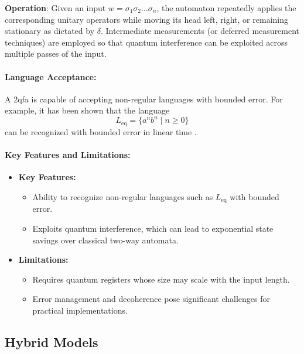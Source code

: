 \textbf{Operation}:  
Given an input \( w = \sigma_1\sigma_2\ldots\sigma_n \), the automaton repeatedly applies the corresponding unitary operators while moving its head left, right, or remaining stationary as dictated by \(\delta\). Intermediate measurements (or deferred measurement techniques) are employed so that quantum interference can be exploited across multiple passes of the input.

\paragraph{Language Acceptance:}  
A \gls{2qfa} is capable of accepting non-regular languages with bounded error. For example, it has been shown that the language 
\[
L_{\text{eq}} = \{a^n b^n \mid n \geq 0\}
\]
can be recognized with bounded error in linear time \cite{kondacs1997power, yakaryilmaz2010succinctness}.

\paragraph{Key Features and Limitations:}
\begin{itemize}
    \item \textbf{Key Features:}
    \begin{itemize}
        \item Ability to recognize non-regular languages such as \( L_{\text{eq}} \) with bounded error.
        \item Exploits quantum interference, which can lead to exponential state savings over classical two-way automata.
    \end{itemize}
    \item \textbf{Limitations:}
    \begin{itemize}
        \item Requires quantum registers whose size may scale with the input length.
        \item Error management and decoherence pose significant challenges for practical implementations.
    \end{itemize}
\end{itemize}

\subsection{Hybrid Models}
\label{subsec:two-way-hybrid}

